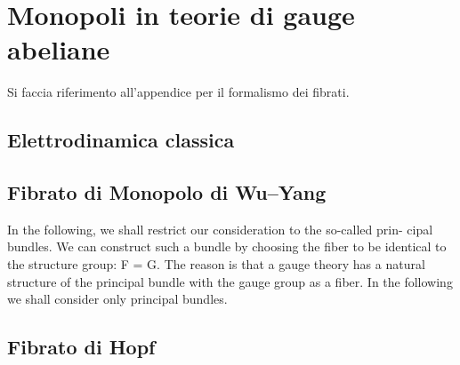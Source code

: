 \chapter{Monopoli in teorie di gauge abeliane}
Si faccia riferimento all'appendice per il formalismo dei fibrati.
\section{Elettrodinamica classica}

\section{Fibrato di Monopolo di Wu–Yang}
In the following, we shall restrict our consideration to the so-called prin-
cipal bundles. We can construct such a bundle by choosing the fiber to be
identical to the structure group: F = G. The reason is that a gauge theory
has a natural structure of the principal bundle with the gauge group as a
fiber. In the following we shall consider only principal bundles.

\section{Fibrato di Hopf}
